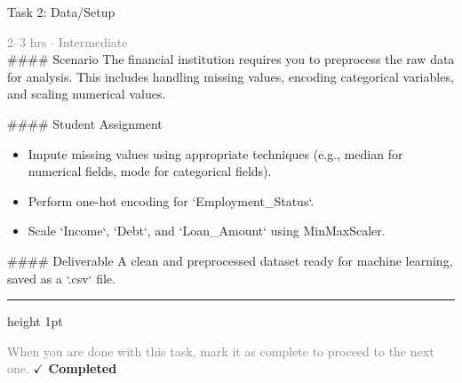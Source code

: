 \documentclass[10pt,a4paper]{article}
\begin{document}
\begin{taskbox}{Task 2: Data/Setup}

    {\small \textcolor{gray}{2--3 hrs $\cdot$ Intermediate}}\\[12pt]

    \#\#\#\# Scenario  
The financial institution requires you to preprocess the raw data for analysis. This includes handling missing values, encoding categorical variables, and scaling numerical values.  

\#\#\#\# Student Assignment  
\begin{itemize}
    \item Impute missing values using appropriate techniques (e.g., median for numerical fields, mode for categorical fields).  
    \item Perform one-hot encoding for `Employment\_Status`.  
    \item Scale `Income`, `Debt`, and `Loan\_Amount` using MinMaxScaler.  
\end{itemize}

\#\#\#\# Deliverable  
A clean and preprocessed dataset ready for machine learning, saved as a `.csv` file.\par

    \vspace{16pt}

    \textcolor{cardBorder}{\hrule height 1pt}\vspace{8pt}

    \small \textcolor{gray}{When you are done with this task, mark it as complete to proceed to the next one.} \hfill \textbf{\textcolor{brandDark}{$\checkmark$ Completed}}

\end{taskbox}
\end{document}
